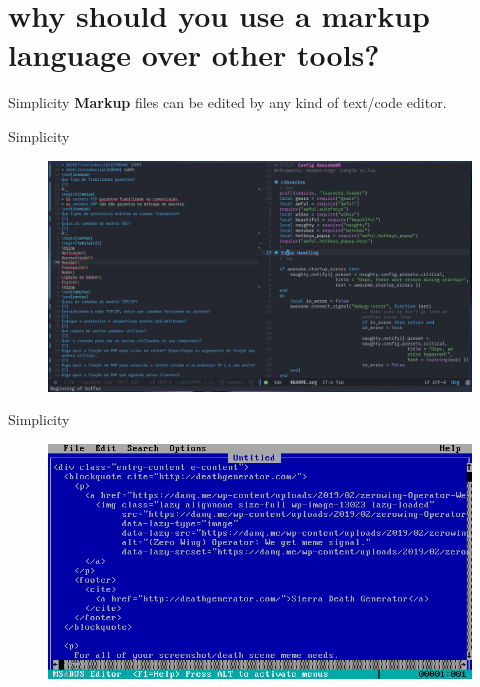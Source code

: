 \documentclass[compress]{beamer}
\begin{document}
\section{why should you use a markup language over other tools?}

\begin{frame}{Simplicity}
    \textbf{Markup} files can be edited by any kind of text/code editor.
\end{frame}
\begin{frame}{Simplicity}
    \begin{figure}
        \centering
        \includegraphics[width=1\textwidth]{img/OQdfAt1.png}
    \end{figure}
\end{frame}
\begin{frame}{Simplicity}
    \begin{figure}
        \centering
        \includegraphics[width=1\textwidth]{img/wpeditcom.png}
    \end{figure}
\end{frame}
\end{document}
